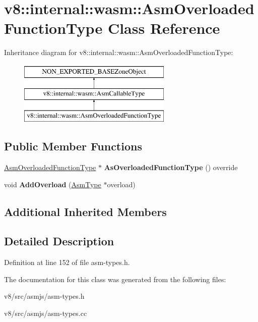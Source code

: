 \hypertarget{classv8_1_1internal_1_1wasm_1_1AsmOverloadedFunctionType}{}\section{v8\+:\+:internal\+:\+:wasm\+:\+:Asm\+Overloaded\+Function\+Type Class Reference}
\label{classv8_1_1internal_1_1wasm_1_1AsmOverloadedFunctionType}
Inheritance diagram for v8\+:\+:internal\+:\+:wasm\+:\+:Asm\+Overloaded\+Function\+Type\+:\begin{figure}[H]
\begin{center}
\leavevmode
\includegraphics[height=3.000000cm]{classv8_1_1internal_1_1wasm_1_1AsmOverloadedFunctionType}
\end{center}
\end{figure}
\subsection*{Public Member Functions}
\begin{DoxyCompactItemize}
\item 
\mbox{\label{classv8_1_1internal_1_1wasm_1_1AsmOverloadedFunctionType_ac9611054fab9332f11d14f15011c0684}} 
\mbox{\hyperlink{classv8_1_1internal_1_1wasm_1_1AsmOverloadedFunctionType}{Asm\+Overloaded\+Function\+Type}} $\ast$ {\bfseries As\+Overloaded\+Function\+Type} () override
\item 
\mbox{\label{classv8_1_1internal_1_1wasm_1_1AsmOverloadedFunctionType_a5925207fc78865ee89a6018d3c35ff35}} 
void {\bfseries Add\+Overload} (\mbox{\hyperlink{classv8_1_1internal_1_1wasm_1_1AsmType}{Asm\+Type}} $\ast$overload)
\end{DoxyCompactItemize}
\subsection*{Additional Inherited Members}


\subsection{Detailed Description}


Definition at line 152 of file asm-\/types.\+h.



The documentation for this class was generated from the following files\+:\begin{DoxyCompactItemize}
\item 
v8/src/asmjs/asm-\/types.\+h\item 
v8/src/asmjs/asm-\/types.\+cc\end{DoxyCompactItemize}
